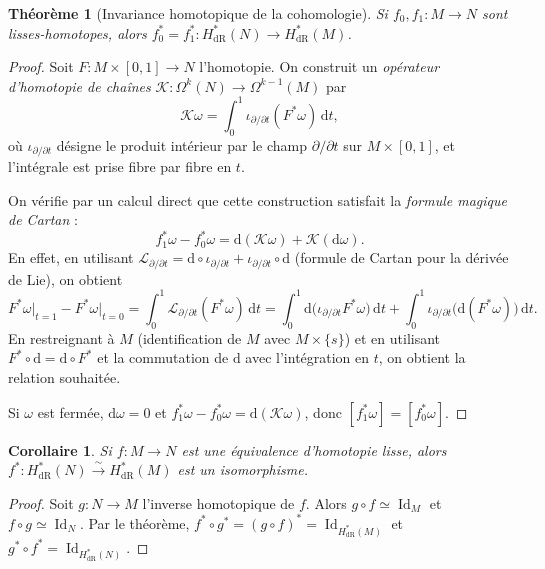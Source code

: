 \documentclass[12pt,a4paper,openany]{book}
\theoremstyle{definition}
\theoremstyle{plain}
\newtheorem{theoreme}[definition]{Théorème}
\newtheorem{corollaire}[definition]{Corollaire}
\theoremstyle{remark}
\DeclareMathOperator{\Id}{Id}
\newcommand{\dd}{\mathrm{d}}
\begin{document}
\begin{theoreme}[Invariance homotopique de la cohomologie]\label{thm:invariance-homotopique}
Si $f_0, f_1 \colon M \to N$ sont lisses-homotopes, alors
$f_0^* = f_1^* \colon H^*_{\mathrm{dR}}(N) \to H^*_{\mathrm{dR}}(M)$.
\end{theoreme}

\begin{proof}
Soit $F \colon M \times [0,1] \to N$ l'homotopie. On construit un
\emph{opérateur d'homotopie de chaînes}
$\mathcal{K} \colon \Omega^k(N) \to \Omega^{k-1}(M)$ par
\[
  \mathcal{K}\omega = \int_0^1 \iota_{\partial/\partial t}(F^*\omega)\,\dd t,
\]
où $\iota_{\partial/\partial t}$ désigne le produit intérieur par le champ
$\partial/\partial t$ sur $M \times [0,1]$, et l'intégrale est prise fibre
par fibre en $t$.

On vérifie par un calcul direct que cette construction satisfait
la \emph{formule magique de Cartan} :
\[
  f_1^*\omega - f_0^*\omega = \dd(\mathcal{K}\omega) + \mathcal{K}(\dd\omega).
\]
En effet, en utilisant $\mathcal{L}_{\partial/\partial t} = \dd \circ
\iota_{\partial/\partial t} + \iota_{\partial/\partial t} \circ \dd$ (formule
de Cartan pour la dérivée de Lie), on obtient
\[
  F^*\omega\big|_{t=1} - F^*\omega\big|_{t=0}
  = \int_0^1 \mathcal{L}_{\partial/\partial t}(F^*\omega)\,\dd t
  = \int_0^1 \dd\bigl(\iota_{\partial/\partial t}F^*\omega\bigr)\,\dd t
  + \int_0^1 \iota_{\partial/\partial t}\bigl(\dd(F^*\omega)\bigr)\,\dd t.
\]
En restreignant à $M$ (identification de $M$ avec $M\times\{s\}$) et en
utilisant $F^*\circ\dd = \dd\circ F^*$ et la commutation de $\dd$ avec
l'intégration en $t$, on obtient la relation souhaitée.

Si $\omega$ est fermée, $\dd\omega = 0$ et
$f_1^*\omega - f_0^*\omega = \dd(\mathcal{K}\omega)$, donc
$[f_1^*\omega] = [f_0^*\omega]$.
\end{proof}

\begin{corollaire}\label{cor:equiv-homotopie-cohomologie}
Si $f \colon M \to N$ est une équivalence d'homotopie lisse, alors
$f^* \colon H^*_{\mathrm{dR}}(N) \xrightarrow{\sim} H^*_{\mathrm{dR}}(M)$
est un isomorphisme.
\end{corollaire}

\begin{proof}
Soit $g \colon N \to M$ l'inverse homotopique de $f$. Alors $g \circ f
\simeq \Id_M$ et $f \circ g \simeq \Id_N$. Par le théorème,
$f^* \circ g^* = (g \circ f)^* = \Id_{H^*_{\mathrm{dR}}(M)}$ et
$g^* \circ f^* = \Id_{H^*_{\mathrm{dR}}(N)}$.
\end{proof}
\end{document}
